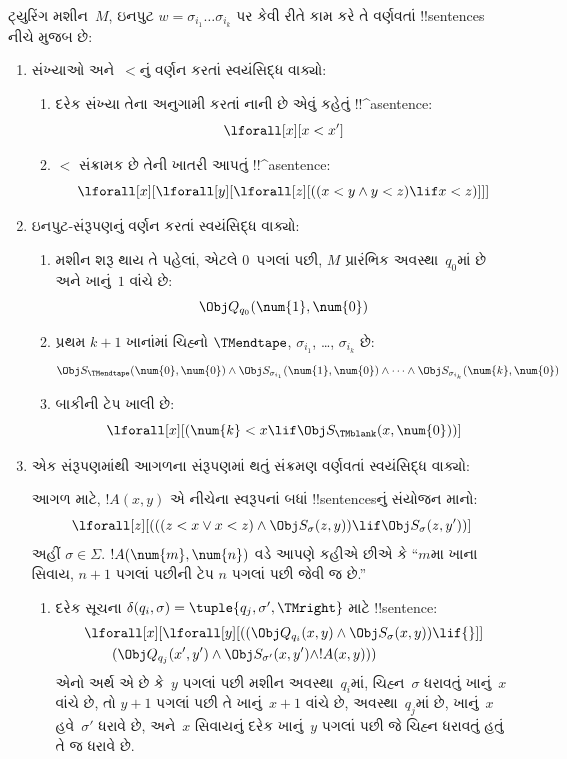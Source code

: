\documentclass[../../../include/open-logic-section]{subfiles}
\begin{document}
ટ્યુરિંગ મશીન~$M$, ઇનપુટ
$w = \sigma_{i_1}\dots\sigma_{i_k}$ પર કેવી રીતે
કામ કરે તે વર્ણવતાં !!{sentence}s નીચે મુજબ છે:
\begin{enumerate}
\item સંખ્યાઓ અને~$<$નું વર્ણન કરતાં સ્વયંસિદ્ધ વાક્યો:
\begin{enumerate}
\item દરેક સંખ્યા તેના અનુગામી કરતાં નાની છે એવું
કહેતું !!^a{sentence}:
\[
\lforall[x][x < x']
\]
\item $<$ સંક્રામક છે તેની ખાતરી આપતું !!^a{sentence}:
\[
\lforall[x][\lforall[y][\lforall[z][
      ((x < y \land y < z) \lif x < z)]]]
\]
\end{enumerate}
\item ઇનપુટ-સંરૂપણનું વર્ણન કરતાં સ્વયંસિદ્ધ વાક્યો:
\begin{enumerate}
\item મશીન શરૂ થાય તે પહેલાં, એટલે $0$~પગલાં પછી,
  $M$ પ્રારંભિક અવસ્થા~$q_0$માં છે અને ખાનું~$1$
  વાંચે છે:
\[
\Obj Q_{q_0}(\num{1}, \num{0})
\]
\item પ્રથમ $k+1$ ખાનાંમાં ચિહ્નો $\TMendtape$,
  $\sigma_{i_1}$, \dots, $\sigma_{i_k}$ છે:
\[
\Obj S_\TMendtape(\num{0}, \num{0}) \land
\Obj S_{\sigma_{i_1}}(\num{1}, \num{0}) \land
\dots \land
\Obj S_{\sigma_{i_k}}(\num{k}, \num{0})
\]
\item બાકીની ટેપ ખાલી છે:
\[
\lforall[x][(\num{k} < x \lif \Obj S_\TMblank(x, \num{0}))]
\]
\end{enumerate}
\item એક સંરૂપણમાંથી આગળના સંરૂપણમાં થતું સંક્રમણ
  વર્ણવતાં સ્વયંસિદ્ધ વાક્યો:

આગળ માટે, $!A(x, y)$ એ નીચેના સ્વરૂપનાં બધાં
!!{sentence}sનું સંયોજન માનો:
\[
\lforall[z][
  (((z < x \lor x < z) \land \Obj S_\sigma(z, y))
  \lif \Obj S_\sigma(z, y'))]
\]
અહીં $\sigma \in \Sigma$. $!A(\num{m},\num{n})$
વડે આપણે કહીએ છીએ કે ``$m$મા ખાના સિવાય,
$n+1$ પગલાં પછીની ટેપ $n$ પગલાં પછી જેવી જ છે.''
\begin{enumerate}
\item {} દરેક સૂચના
  $\delta(q_i, \sigma) =
  \tuple{q_j, \sigma', \TMright}$ માટે !!{sentence}:
\begin{align*}
& \lforall[x][\lforall[y][(
   (\Obj Q_{q_i}(x, y) \land \Obj S_{\sigma}(x, y)) \lif {}]] \\
&\qquad   (\Obj Q_{q_j}(x', y') \land \Obj S_{\sigma'}(x, y') \land
!A(x, y)))
\end{align*}
એનો અર્થ એ છે કે~$y$ પગલાં પછી મશીન
અવસ્થા~$q_i$માં, ચિહ્ન~$\sigma$ ધરાવતું ખાનું~$x$
વાંચે છે, તો $y+1$ પગલાં પછી તે ખાનું~$x+1$ વાંચે છે,
અવસ્થા~$q_j$માં છે, ખાનું~$x$ હવે~$\sigma'$ ધરાવે છે,
અને~$x$ સિવાયનું દરેક ખાનું~$y$ પગલાં પછી જે ચિહ્ન
ધરાવતું હતું તે જ ધરાવે છે.


\end{enumerate}
\end{enumerate}
\end{document}
